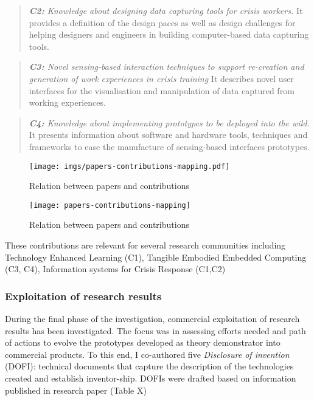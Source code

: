 \begin{quote}
\emph{\textbf{C2:} Knowledge about designing data capturing tools for
crisis workers.} It provides a definition of the design paces as well as
design challenges for helping designers and engineers in building
computer-based data capturing tools.
\end{quote}

\begin{quote}
\emph{\textbf{C3:} Novel sensing-based interaction techniques to support
re-creation and generation of work experiences in crisis training} It
describes novel user interfaces for the visualisation and manipulation
of data captured from working experiences.
\end{quote}

\begin{quote}
\emph{\textbf{C4:} Knowledge about implementing prototypes to be
deployed into the wild.} It presents information about software and
hardware tools, techniques and frameworks to ease the manufacture of
sensing-based interfaces prototypes.
\end{quote}

\begin{figure}[htbp]
\centering
\texttt{[image: imgs/papers-contributions-mapping.pdf]}
\caption{Relation between papers and contributions}
\end{figure}

\begin{figure}[tbh]
    \centering
    \texttt{[image: papers-contributions-mapping]}
    \caption{Relation between papers and contributions}
    \label{fig:mapping}
\end{figure}

These contributions are relevant for several research communities
including Technology Enhanced Learning (C1), Tangible Embodied Embedded
Computing (C3, C4), Information systems for Crisis Response (C1,C2)

\subsubsection{Exploitation of research
results}\label{exploitation-of-research-results}

During the final phase of the investigation, commercial exploitation of
research results has been investigated. The focus was in assessing
efforts needed and path of actions to evolve the prototypes developed as
theory demonstrator into commercial products. To this end, I co-authored
five \emph{Disclosure of invention} (DOFI): technical documents that
capture the description of the technologies created and establish
inventor-ship. DOFIs were drafted based on information published in
research paper (Table X)

